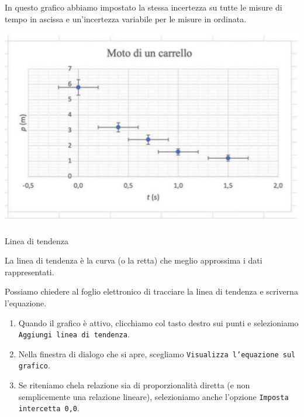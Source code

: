 \documentclass[12pt,a4paper,oneside]{book}
\makeatletter
\newcounter{testexample} %
\renewcommand{\subsubsection}{\@startsection {subsubsection}{3}{\z@}
{-2ex \@plus -0.1ex \@minus -.2ex}
{.2ex \@plus.2ex }
{\color[rgb]{0.141,0.596,0.749}\normalfont\small\sffamily\bfseries}}
\theoremstyle{esercizio}
\makeatother
\begin{document}
\begin{testexample}

    In questo grafico abbiamo impostato la stessa incertezza su tutte le misure 
    di tempo in ascissa e un'incertezza variabile per le misure in ordinata.
    
     \begin{minipage}{\linewidth}
        \centering
        \includegraphics[scale=0.3]{path_to_image/moto-carrello-libre.png} 
        \label{fig:motocarrellolibre}\end{minipage}
    \end{testexample}

\subsubsection{Linea di tendenza}

\begin{definizione}
    La linea di tendenza è la curva (o la retta) che meglio approssima i dati
    rappresentati.
\end{definizione}

Possiamo chiedere al foglio elettronico di tracciare la linea di tendenza e 
scriverna l'equazione. 
\begin{enumerate}
    \item Quando il grafico è attivo, clicchiamo col tasto destro sui punti e 
    selezioniamo \texttt{Aggiungi linea di tendenza}. 
    \item Nella finestra di dialogo che si apre, scegliamo \texttt{Visualizza l'equazione sul grafico}. 
    \item Se riteniamo chela relazione sia di proporzionalità diretta (e non 
    semplicemente una relazione lineare), selezioniamo anche l'opzione 
    \texttt{Imposta intercetta 0,0}. 
\end{enumerate}
\end{document}
